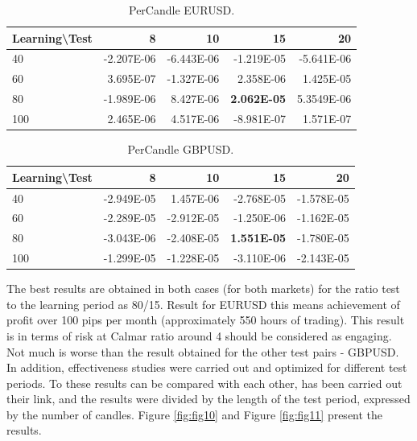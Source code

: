 \documentclass[runningheads,a4paper]{llncs}
\begin{document}
\begin{table}[h!]
\centering
\caption{PerCandle EURUSD.}
\label{tab:tab3}
\begin{tabular}{|l|r|r|r|r|} \hline
Learning\textbackslash Test &	8	 &	10 &		15	 &	20\\ \hline
40 &		-2.207E-06 &		-6.443E-06 &		-1.219E-05 &		-5.641E-06\\ \hline
60 &		3.695E-07 &		-1.327E-06 &		2.358E-06 &		1.425E-05\\ \hline
80 &		-1.989E-06 &		8.427E-06	 &	\textbf{2.062E-05} &		5.3549E-06\\ \hline
100	 &	2.465E-06 &		4.517E-06 &		-8.981E-07 &		1.571E-07\\ \hline
\end{tabular}
\end{table}
\FloatBarrier

\begin{table}[h!]
\centering
\caption{PerCandle GBPUSD.}
\label{tab:tab4}
\begin{tabular}{|l|r|r|r|r|} \hline
Learning\textbackslash Test &	8	 & 	10 &		15	 &	20\\ \hline
40	 & -2.949E-05 & 	1.457E-06 & 	-2.768E-05	 & -1.578E-05\\ \hline
60	 & -2.289E-05 & 	-2.912E-05 & 	-1.250E-06 & 	-1.162E-05\\ \hline
80	 & -3.043E-06 & 	-2.408E-05	 & \textbf{1.551E-05} & 	-1.780E-05\\ \hline
100	 & -1.299E-05 & 	-1.228E-05 & 	-3.110E-06	 & -2.143E-05\\ \hline
\end{tabular}
\end{table}
\FloatBarrier


The best results are obtained in both cases (for both markets) for the ratio test to the learning period as 80/15. Result for EURUSD this means achievement of profit over 100 pips per month (approximately 550 hours of trading). This result is in terms of risk at Calmar ratio around 4 should be considered as engaging. Not much is worse than the result obtained for the other test pairs - GBPUSD.\\

In addition, effectiveness studies were carried out and optimized for different test periods. To these results can be compared with each other, has been carried out their link, and the results were divided by the length of the test period, expressed by the number of candles. 
Figure \ref{fig:fig10} and Figure \ref{fig:fig11} present the results.
\end{document}
